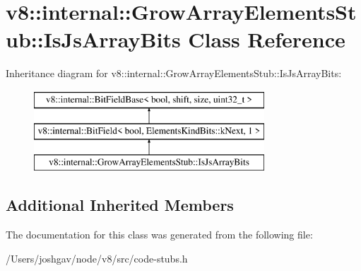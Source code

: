 \hypertarget{classv8_1_1internal_1_1_grow_array_elements_stub_1_1_is_js_array_bits}{}\section{v8\+:\+:internal\+:\+:Grow\+Array\+Elements\+Stub\+:\+:Is\+Js\+Array\+Bits Class Reference}
\label{classv8_1_1internal_1_1_grow_array_elements_stub_1_1_is_js_array_bits}
Inheritance diagram for v8\+:\+:internal\+:\+:Grow\+Array\+Elements\+Stub\+:\+:Is\+Js\+Array\+Bits\+:\begin{figure}[H]
\begin{center}
\leavevmode
\includegraphics[height=3.000000cm]{classv8_1_1internal_1_1_grow_array_elements_stub_1_1_is_js_array_bits}
\end{center}
\end{figure}
\subsection*{Additional Inherited Members}


The documentation for this class was generated from the following file\+:\begin{DoxyCompactItemize}
\item 
/\+Users/joshgav/node/v8/src/code-\/stubs.\+h\end{DoxyCompactItemize}
